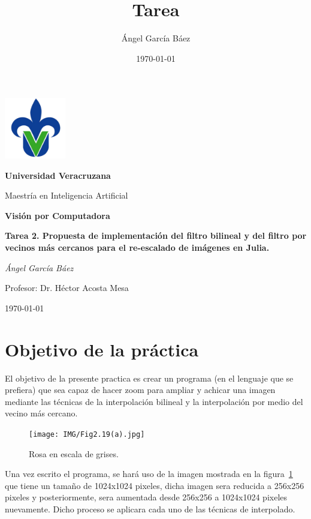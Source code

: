 \documentclass[11pt, letterpaper]{article}
\title{\bfseries Tarea}
\author{Ángel García Báez}
\date{\today}
\begin{document}
	
	\begin{titlepage}
		\centering
		\includegraphics[width=0.2\textwidth]{logo.png}\par
		\vspace{1cm}
		{\LARGE \bfseries Universidad Veracruzana \par}
		\vspace{1cm}
		{\Large Maestría en Inteligencia Artificial\par}
		\vspace{3cm}
		{\LARGE \bfseries Visión por Computadora \par}
		\vspace{1cm}
		{\Large \bfseries Tarea 2. Propuesta de implementación del filtro bilineal y del filtro por vecinos más cercanos para el re-escalado de imágenes en Julia. \par}
		\vfill
		{\Large \textit{Ángel García Báez}\par}
		\vspace{1cm}
		{\Large Profesor: Dr. Héctor Acosta Mesa\par}
		\vfill
		{\Large \today \par}
	\end{titlepage}
	
	\newpage
	\tableofcontents
	\newpage
	
	\section{Objetivo de la práctica}
	
	El objetivo de la presente practica es crear un programa (en el lenguaje que se prefiera) que sea capaz de hacer zoom para ampliar y achicar una imagen mediante las técnicas de la interpolación bilineal y la interpolación por medio del vecino más cercano.
			
	\begin{figure}[h]
		\centering
		\texttt{[image: IMG/Fig2.19(a).jpg]}
		\caption{Rosa en escala de grises.}
		\label{fig:f1}
	\end{figure}
	
	Una vez escrito el programa, se hará uso de la imagen mostrada en la figura~\ref{fig:f1} que tiene un tamaño de 1024x1024 pixeles, dicha imagen sera reducida a 256x256 pixeles y posteriormente, sera aumentada desde 256x256 a 1024x1024 pixeles nuevamente. Dicho proceso se aplicara cada uno de las técnicas de interpolado. 
	
\end{document}
